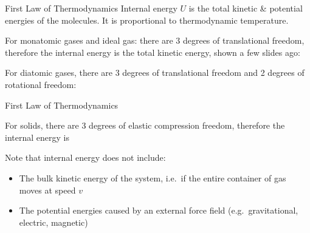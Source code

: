 \documentclass[12pt,aspectratio=169]{beamer}
\newcommand{\eq}[2]{
  \vspace{#1}{\Large
    \begin{displaymath}
      #2
    \end{displaymath}
  }
}
\begin{document}
\begin{frame}{First Law of Thermodynamics}
  Internal energy $U$ is the total kinetic \& potential energies of the
  molecules. It is proportional to thermodynamic temperature.

  \eq{-.25in}{
    \boxed{\Delta\textcolor{red}{U}=Q-W}
  }

  \vspace{-.1in}For monatomic gases and ideal gas: there are 3 degrees of
  translational freedom, therefore the internal energy is the total kinetic
  energy, shown a few slides ago:

  \eq{-.25in}{
    U=\frac32Nk_BT
  }

  For diatomic gases, there are 3 degrees of translational freedom and 2
  degrees of rotational freedom:

    \eq{-.32in}{
      U=\frac52Nk_BT
    }
\end{frame}



\begin{frame}{First Law of Thermodynamics}
  \eq{-.2in}{
    \boxed{\Delta\textcolor{red}{U}=Q-W}
  }

  For solids, there are 3 degrees of elastic compression freedom, therefore the
  internal energy is

  \eq{-.3in}{
    U=3Nk_BT
  }

  Note that internal energy does not include:
  \begin{itemize}
  \item The bulk kinetic energy of the system, i.e.\ if the entire container
    of gas moves at speed $v$
  \item The potential energies caused by an external force field (e.g.\
    gravitational, electric, magnetic)
  \end{itemize}
\end{frame}
\end{document}
